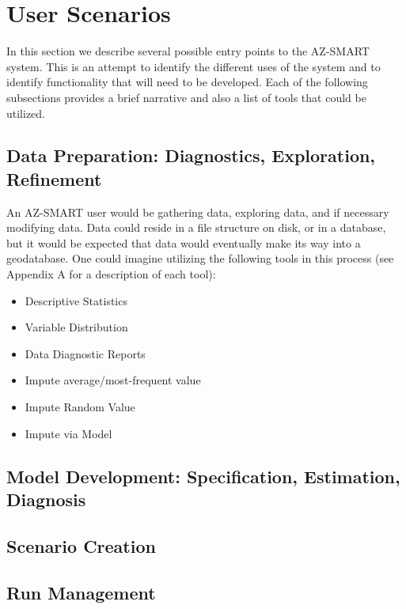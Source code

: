 \section{User Scenarios}

In this section we describe several possible entry points to the AZ-SMART system.
This is an attempt to identify the different uses of the system and to identify
functionality that will need to be developed.  Each of the following subsections
provides a brief narrative and also a list of tools that could be utilized.

\subsection{Data Preparation: Diagnostics, Exploration, Refinement}

An AZ-SMART user would be gathering data, exploring data, and if necessary
modifying data.  Data could reside in a file structure on disk, or in a database,
but it would be expected that data would eventually make its way into a geodatabase.
One could imagine utilizing the following tools in this process (see Appendix A for
a description of each tool):

\begin{itemize}
    \item Descriptive Statistics
    \item Variable Distribution
    \item Data Diagnostic Reports
    \item Impute average/most-frequent value
    \item Impute Random Value
    \item Impute via Model
\end{itemize}

\subsection{Model Development: Specification, Estimation, Diagnosis}



\subsection{Scenario Creation}



\subsection{Run Management}



